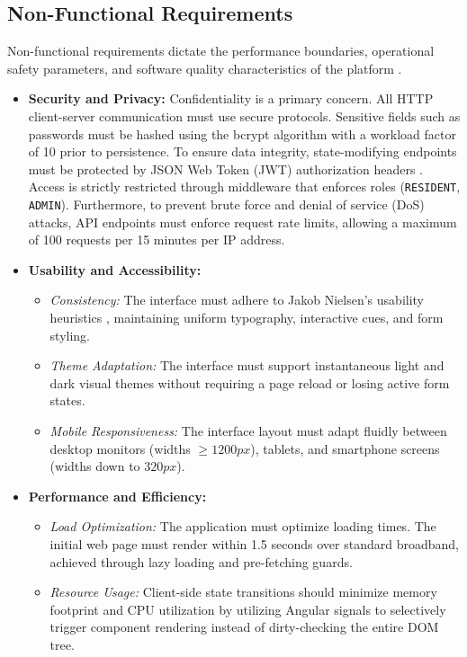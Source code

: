\subsection{Non-Functional Requirements}
Non-functional requirements dictate the performance boundaries, operational safety parameters, and software quality characteristics of the platform \cite{sommerville2016software}.

\begin{itemize}
    \item \textbf{Security and Privacy:}
    Confidentiality is a primary concern. All HTTP client-server communication must use secure protocols. Sensitive fields such as passwords must be hashed using the bcrypt algorithm with a workload factor of 10 prior to persistence. To ensure data integrity, state-modifying endpoints must be protected by JSON Web Token (JWT) authorization headers \cite{jones2015jwt}. Access is strictly restricted through middleware that enforces roles (\texttt{RESIDENT}, \texttt{ADMIN}). Furthermore, to prevent brute force and denial of service (DoS) attacks, API endpoints must enforce request rate limits, allowing a maximum of 100 requests per 15 minutes per IP address.
    
    \item \textbf{Usability and Accessibility:}
    \begin{itemize}
        \item \emph{Consistency:} The interface must adhere to Jakob Nielsen's usability heuristics \cite{nielsen1994usability}, maintaining uniform typography, interactive cues, and form styling.
        \item \emph{Theme Adaptation:} The interface must support instantaneous light and dark visual themes without requiring a page reload or losing active form states.
        \item \emph{Mobile Responsiveness:} The interface layout must adapt fluidly between desktop monitors (widths $\ge 1200px$), tablets, and smartphone screens (widths down to $320px$).
    \end{itemize}
    
    \item \textbf{Performance and Efficiency:}
    \begin{itemize}
        \item \emph{Load Optimization:} The application must optimize loading times. The initial web page must render within 1.5 seconds over standard broadband, achieved through lazy loading and pre-fetching guards.
        \item \emph{Resource Usage:} Client-side state transitions should minimize memory footprint and CPU utilization by utilizing Angular signals to selectively trigger component rendering instead of dirty-checking the entire DOM tree.
    \end{itemize}


\end{itemize}
